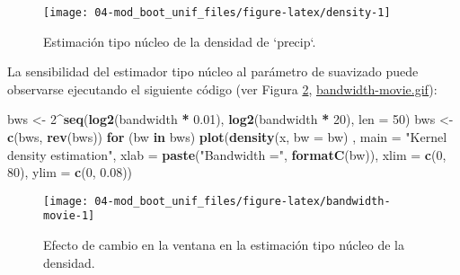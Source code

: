 \documentclass[
]{book}
\newenvironment{Shaded}{\begin{snugshade}}{\end{snugshade}}
\newcommand{\ControlFlowTok}[1]{\textcolor[rgb]{0.13,0.29,0.53}{\textbf{#1}}}
\newcommand{\DataTypeTok}[1]{\textcolor[rgb]{0.13,0.29,0.53}{#1}}
\newcommand{\DecValTok}[1]{\textcolor[rgb]{0.00,0.00,0.81}{#1}}
\newcommand{\FloatTok}[1]{\textcolor[rgb]{0.00,0.00,0.81}{#1}}
\newcommand{\KeywordTok}[1]{\textcolor[rgb]{0.13,0.29,0.53}{\textbf{#1}}}
\newcommand{\NormalTok}[1]{#1}
\newcommand{\OperatorTok}[1]{\textcolor[rgb]{0.81,0.36,0.00}{\textbf{#1}}}
\newcommand{\StringTok}[1]{\textcolor[rgb]{0.31,0.60,0.02}{#1}}
\theoremstyle{definition}
\theoremstyle{definition}
\theoremstyle{definition}
\theoremstyle{remark}
\begin{document}
\begin{figure}[!htb]

{\centering \texttt{[image: 04-mod\_boot\_unif\_files/figure-latex/density-1]} 

}

\caption{Estimación tipo núcleo de la densidad de `precip`. }\label{fig:density}
\end{figure}

La sensibilidad del estimador tipo núcleo al parámetro de suavizado puede
observarse ejecutando el siguiente código (ver Figura \ref{fig:bandwidth-movie}, \href{./bandwidth-movie.gif}{bandwidth-movie.gif}):

\begin{Shaded}
\begin{Highlighting}[]
\NormalTok{bws <-}\StringTok{ }\DecValTok{2}\OperatorTok{^}\KeywordTok{seq}\NormalTok{(}\KeywordTok{log2}\NormalTok{(bandwidth }\OperatorTok{*}\StringTok{ }\FloatTok{0.01}\NormalTok{), }\KeywordTok{log2}\NormalTok{(bandwidth }\OperatorTok{*}\StringTok{ }\DecValTok{20}\NormalTok{), }\DataTypeTok{len =} \DecValTok{50}\NormalTok{)}
\NormalTok{bws <-}\StringTok{ }\KeywordTok{c}\NormalTok{(bws, }\KeywordTok{rev}\NormalTok{(bws))}
\ControlFlowTok{for}\NormalTok{ (bw }\ControlFlowTok{in}\NormalTok{ bws)}
  \KeywordTok{plot}\NormalTok{(}\KeywordTok{density}\NormalTok{(x, }\DataTypeTok{bw =}\NormalTok{ bw) , }\DataTypeTok{main =} \StringTok{"Kernel density estimation"}\NormalTok{, }
         \DataTypeTok{xlab =} \KeywordTok{paste}\NormalTok{(}\StringTok{"Bandwidth ="}\NormalTok{, }\KeywordTok{formatC}\NormalTok{(bw)), }
         \DataTypeTok{xlim =} \KeywordTok{c}\NormalTok{(}\DecValTok{0}\NormalTok{, }\DecValTok{80}\NormalTok{), }\DataTypeTok{ylim =} \KeywordTok{c}\NormalTok{(}\DecValTok{0}\NormalTok{, }\FloatTok{0.08}\NormalTok{))}
\end{Highlighting}
\end{Shaded}

\begin{figure}[!htb]

{\centering \texttt{[image: 04-mod\_boot\_unif\_files/figure-latex/bandwidth-movie-1]} 

}

\caption{Efecto de cambio en la ventana en la estimación tipo núcleo de la densidad.}\label{fig:bandwidth-movie}
\end{figure}
\end{document}
